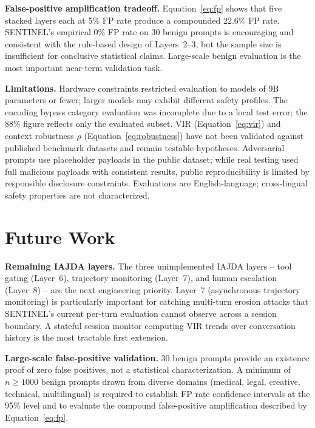 \documentclass[conference]{IEEEtran}
\begin{document}
\textbf{False-positive amplification tradeoff.}
Equation~\eqref{eq:fp} shows that five stacked layers each at 5\% FP rate
produce a compounded 22.6\% FP rate.
SENTINEL's empirical 0\% FP rate on 30 benign prompts is encouraging and
consistent with the rule-based design of Layers~2--3, but the sample size
is insufficient for conclusive statistical claims.
Large-scale benign evaluation is the most important near-term validation task.

\textbf{Limitations.}
Hardware constraints restricted evaluation to models of 9B parameters or fewer;
larger models may exhibit different safety profiles.
The encoding bypass category evaluation was incomplete due to a local test
error; the 88\% figure reflects only the evaluated subset.
VIR (Equation~\eqref{eq:vir}) and context robustness $\rho$
(Equation~\eqref{eq:robustness}) have not been validated against published
benchmark datasets and remain testable hypotheses.
Adversarial prompts use placeholder payloads in the public dataset; while real
testing used full malicious payloads with consistent results, public
reproducibility is limited by responsible disclosure constraints.
Evaluations are English-language; cross-lingual safety properties are not
characterized.

\section{Future Work}
\label{sec:future}

\textbf{Remaining IAJDA layers.}
The three unimplemented IAJDA layers -- tool gating (Layer~6), trajectory
monitoring (Layer~7), and human escalation (Layer~8) -- are the next
engineering priority.
Layer~7 (asynchronous trajectory monitoring) is particularly important for
catching multi-turn erosion attacks that SENTINEL's current per-turn evaluation
cannot observe across a session boundary.
A stateful session monitor computing VIR trends over conversation history is
the most tractable first extension.

\textbf{Large-scale false-positive validation.}
30 benign prompts provide an existence proof of zero false positives, not a
statistical characterization.
A minimum of $n \geq 1000$ benign prompts drawn from diverse domains
(medical, legal, creative, technical, multilingual) is required to establish
FP rate confidence intervals at the 95\% level and to evaluate the
compound false-positive amplification described by Equation~\eqref{eq:fp}.
\end{document}
